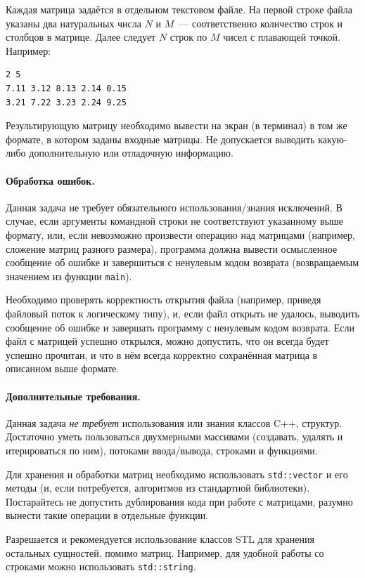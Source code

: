 \documentclass[a4paper,10pt]{article}
\begin{document}
Каждая матрица задаётся в отдельном текстовом файле.
На первой строке файла указаны два натуральных числа $N$ и $M$~---
соответственно количество строк и столбцов в матрице.
Далее следует $N$ строк по $M$ чисел с плавающей точкой.
Например:
\begin{Verbatim}[frame=single]
2 5
7.11 3.12 8.13 2.14 0.15
3.21 7.22 3.23 2.24 9.25
\end{Verbatim}

Результирующую матрицу необходимо вывести на экран (в терминал) в том же формате, в котором заданы входные матрицы.
Не допускается выводить какую-либо дополнительную или отладочную информацию.

\paragraph{Обработка ошибок.}
Данная задача не требует обязательного использования/знания исключений.
В случае, если аргументы командной строки не соответствуют указанному выше формату, или, если невозможно произвести операцию над матрицами (например, сложение матриц разного размера),
программа должна вывести осмысленное сообщение об ошибке и завершиться с ненулевым кодом возврата (возвращаемым значением из функции {\tt main}).

Необходимо проверять корректность открытия файла (например, приведя файловый поток к логическому типу), и, 
если файл открыть не удалось, выводить сообщение об ошибке и завершать программу с ненулевым кодом возврата.
Если файл с матрицей успешно открылся, можно допустить, что он всегда будет успешно прочитан, 
и что в нём всегда корректно сохранённая матрица в описанном выше формате.

\paragraph{Дополнительные требования.}
Данная задача {\em не требует} использования или знания классов C++, структур.
Достаточно уметь пользоваться двухмерными массивами (создавать, удалять и итерироваться по ним), потоками ввода/вывода, строками и функциями.

Для хранения и обработки матриц необходимо использовать {\tt std::vector} и его методы (и, если потребуется, алгоритмов из стандартной библиотеки).
Постарайтесь не допустить дублирования кода при работе с матрицами, разумно вынести такие операции в отдельные функции.

Разрешается и рекомендуется использование классов STL для хранения остальных сущностей, помимо матриц. 
Например, для удобной работы со строками можно использовать {\tt std::string}.
\end{document}
